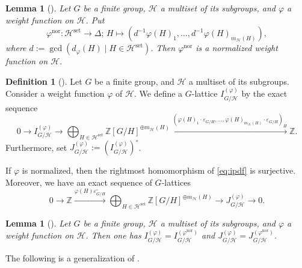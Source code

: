 \documentclass[12pt]{amsart}
\theoremstyle{plain}
\newtheorem{lem}[thm]{Lemma}
\theoremstyle{definition}
\newtheorem{dfn}[thm]{Definition}
\numberwithin{thm}{section}
\numberwithin{equation}{section}
\newcommand{\Z}{\mathbb{Z}}
\newcommand{\cH}{\mathcal{H}}
\DeclareMathOperator{\nor}{nor}
\DeclareMathOperator{\set}{set}
\begin{document}
\begin{lem}[{\cite[Lemma 3.4]{Hasegawa}}]\label{lem:pnor}
Let $G$ be a finite group, $\cH$ a multiset of its subgroups, and $\varphi$ a weight function on $\cH$. Put
\begin{equation*}
\varphi^{\nor} \colon \cH^{\set} \rightarrow \Delta;\,H \mapsto (d^{-1}\varphi(H)_{1},\ldots,d^{-1}\varphi(H)_{m_{\cH}(H)}),
\end{equation*}
where $d:=\gcd(d_{\varphi}(H)\mid H\in \cH^{\set})$. Then $\varphi^{\nor}$ is a normalized weight function on $\cH$. 
\end{lem}

\begin{dfn}[{\cite[Definition 3.5]{Hasegawa}}]\label{dfn:gnmn}
Let $G$ be a finite group, and $\cH$ a multiset of its subgroups. Consider a weight function $\varphi$ of $\cH$. We define a $G$-lattice $I_{G/\cH}^{(\varphi)}$ by the exact sequence
\begin{equation}\label{eq:ipdf}
0\rightarrow I_{G/\cH}^{(\varphi)}\rightarrow \bigoplus_{H\in \cH^{\set}}\Z[G/H]^{\oplus m_{\cH}(H)}\xrightarrow{(\varphi(H)_{1}\cdot \varepsilon_{G/H},\ldots,\varphi(H)_{m_{\cH}(H)}\cdot \varepsilon_{G/H})_{H}} \Z. 
\end{equation}
Furthermore, set $J_{G/\cH}^{(\varphi)}:=(I_{G/\cH}^{(\varphi)})^{\circ}$. 
\end{dfn}

If $\varphi$ is normalized, then the rightmost homomorphism of \eqref{eq:ipdf} is surjective. Moreover, we have an exact sequence of $G$-lattices
\begin{equation*}
    0 \rightarrow \Z \xrightarrow{\varphi(H)\varepsilon_{G/H}^{\circ}}
    \bigoplus_{H\in \cH^{\set}}\Z[G/H]^{\oplus m_{\cH}(H)}\rightarrow 
    J_{G/\cH}^{(\varphi)}\rightarrow 0. 
\end{equation*}

\begin{lem}[{\cite[Lemma 3.7]{Hasegawa}}]\label{lem:dvci}
Let $G$ be a finite group, $\cH$ a multiset of its subgroups, and $\varphi$ a weight function on $\cH$. Then one has $I_{G/\cH}^{(\varphi)}=I_{G/\cH}^{(\varphi^{\nor})}$ and $J_{G/\cH}^{(\varphi)}=J_{G/\cH}^{(\varphi^{\nor})}$. 
\end{lem}

The following is a generalization of \cite[Proposition 1.3]{Endo2011}. 
\end{document}
